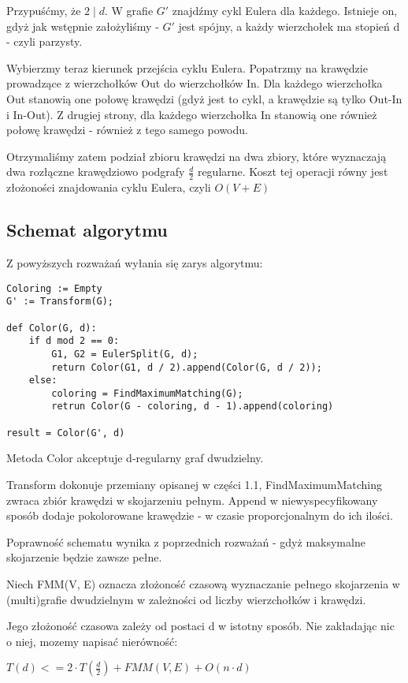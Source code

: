 \documentclass[12pt]{article}
\begin{document}
Przypuśćmy, że $2 \mid d$. W grafie $G'$ znajdźmy cykl Eulera dla każdego. Istnieje on, gdyż jak wstępnie założyliśmy - $G'$ jest spójny, a każdy wierzchołek ma stopień d - czyli parzysty.

Wybierzmy teraz kierunek przejścia cyklu Eulera. Popatrzmy na krawędzie prowadzące z wierzchołków Out do wierzchołków In. Dla każdego wierzchołka Out stanowią one połowę krawędzi (gdyż jest to cykl, a krawędzie są tylko Out-In i In-Out). Z drugiej strony, dla każdego wierzchołka In stanowią one również połowę krawędzi - również z tego samego powodu.

Otrzymaliśmy zatem podział zbioru krawędzi na dwa zbiory, które wyznaczają dwa rozłączne krawędziowo podgrafy $\frac{d}{2}$ regularne. Koszt tej operacji równy jest złożoności znajdowania cyklu Eulera, czyli $O(V+E)$

\subsection{Schemat algorytmu}

Z powyższych rozważań wyłania się zarys algorytmu:

\begin{lstlisting}
Coloring := Empty
G' := Transform(G);

def Color(G, d):
    if d mod 2 == 0:
        G1, G2 = EulerSplit(G, d);
        return Color(G1, d / 2).append(Color(G, d / 2));
    else:
        coloring = FindMaximumMatching(G);
        retrun Color(G - coloring, d - 1).append(coloring)

result = Color(G', d)
\end{lstlisting}

Metoda Color akceptuje d-regularny graf dwudzielny.

Transform dokonuje przemiany opisanej w części 1.1, FindMaximumMatching zwraca zbiór krawędzi w skojarzeniu pełnym. Append w niewyspecyfikowany sposób dodaje pokolorowane krawędzie - w czasie proporcjonalnym do ich ilości.

Poprawność schematu wynika z poprzednich rozważań - gdyż maksymalne skojarzenie będzie zawsze pełne.

Niech FMM(V, E) oznacza złożoność czasową wyznaczanie pełnego skojarzenia w (multi)grafie dwudzielnym w zależności od liczby wierzchołków i krawędzi.

Jego złożoność czasowa zależy od postaci d w istotny sposób. Nie zakładając nic o niej, mozemy napisać nierówność:

$T(d) <= 2 \cdot T(\frac{d}{2}) + FMM(V, E) + O(n \cdot d)$
\end{document}
